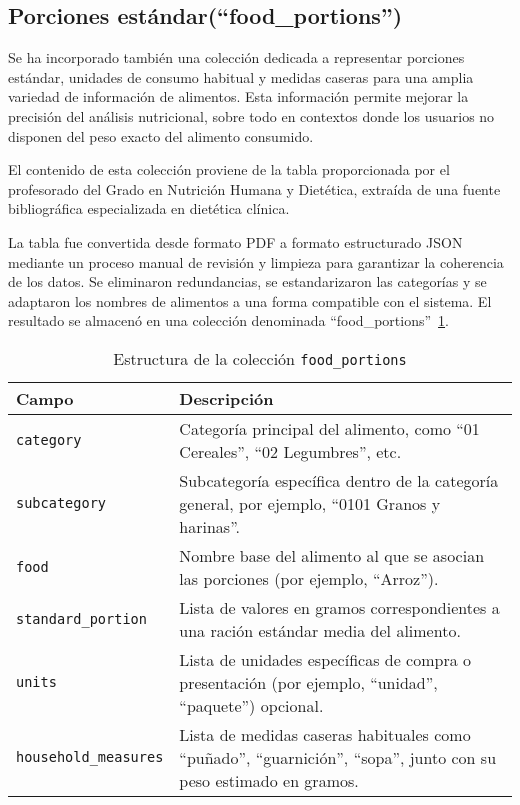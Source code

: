 \subsection{Porciones estándar(``food\_portions'')}
Se ha incorporado también una colección dedicada a representar porciones estándar, unidades de consumo habitual y medidas caseras para una amplia variedad de información de alimentos. Esta información permite mejorar la precisión del análisis nutricional, sobre todo en contextos donde los usuarios no disponen del peso exacto del alimento consumido. 

El contenido de esta colección proviene de la tabla proporcionada por el profesorado del Grado en Nutrición Humana y Dietética, extraída de una fuente bibliográfica especializada en dietética clínica\cite{Aparicio2015raciones}.

La tabla fue convertida desde formato PDF a formato estructurado JSON mediante un proceso manual de revisión y limpieza para garantizar la coherencia de los datos. Se eliminaron redundancias, se estandarizaron las categorías y se adaptaron los nombres de alimentos a una forma compatible con el sistema. El resultado se almacenó en una colección denominada ``food\_portions''~\ref{tab:foodportions}.

\begin{table}[H]
    \centering
    \begin{tabular}{|l|p{8cm}|}
        \hline
        \textbf{Campo} & \textbf{Descripción} \\
        \hline
        \texttt{category} & Categoría principal del alimento, como “01 Cereales”, “02 Legumbres”, etc. \\
        \hline
        \texttt{subcategory} & Subcategoría específica dentro de la categoría general, por ejemplo, “0101 Granos y harinas”. \\
        \hline
        \texttt{food} & Nombre base del alimento al que se asocian las porciones (por ejemplo, “Arroz”). \\
        \hline
        \texttt{standard\_portion} & Lista de valores en gramos correspondientes a una ración estándar media del alimento. \\
        \hline
        \texttt{units} & Lista de unidades específicas de compra o presentación (por ejemplo, “unidad”, “paquete”) opcional. \\
        \hline
        \texttt{household\_measures} & Lista de medidas caseras habituales como “puñado”, “guarnición”, “sopa”, junto con su peso estimado en gramos. \\
        \hline
    \end{tabular}
    \caption{Estructura de la colección \texttt{food\_portions}}
    \label{tab:foodportions}
\end{table}

